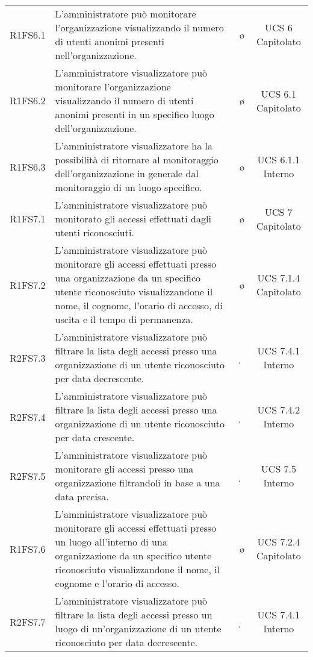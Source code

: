 {\begin{longtable}{ c C{6.5cm} c c}
R1FS6.1 & L'amministratore può monitorare l'organizzazione visualizzando il numero di utenti anonimi presenti nell'organizzazione. & \o & UCS 6 Capitolato\\

R1FS6.2 & L'amministratore visualizzatore può monitorare l'organizzazione visualizzando il numero di utenti anonimi presenti in un specifico luogo dell'organizzazione. & \o & UCS 6.1 Capitolato\\

R1FS6.3 & L'amministratore visualizzatore ha la possibilità di ritornare al monitoraggio dell'organizzazione in generale dal monitoraggio di un luogo specifico. & \o & UCS 6.1.1 Interno\\

R1FS7.1 & L'amministratore visualizzatore può monitorato gli accessi effettuati dagli utenti riconosciuti. & \o & UCS 7 Capitolato\\

R1FS7.2 & L'amministratore visualizzatore può monitorare gli accessi effettuati presso una organizzazione da un specifico utente riconosciuto visualizzandone il nome, il cognome, l'orario di accesso, di uscita e il tempo di permanenza. & \o & UCS 7.1.4 Capitolato\\

R2FS7.3 & L’amministratore visualizzatore può filtrare la lista degli accessi presso una organizzazione di un utente riconosciuto per data decrescente. & \d & UCS 7.4.1 Interno \\

R2FS7.4 & L’amministratore visualizzatore può filtrare la lista degli accessi presso una organizzazione  di un utente riconosciuto per data crescente. & \d & UCS 7.4.2 Interno \\

R2FS7.5 & L'amministratore visualizzatore può monitorare gli accessi presso una organizzazione filtrandoli in base a una data precisa. & \d & UCS 7.5 Interno\\

R1FS7.6 & L'amministratore visualizzatore può monitorare gli accessi effettuati presso un luogo all'interno di una organizzazione da un specifico utente riconosciuto visualizzandone il nome, il cognome e l'orario di accesso. & \o & UCS 7.2.4 Capitolato\\

R2FS7.7 & L’amministratore visualizzatore può filtrare la lista degli accessi presso un luogo di un'organizzazione di un utente riconosciuto per data decrescente. & \d & UCS 7.4.1 Interno \\


\end{longtable}}
